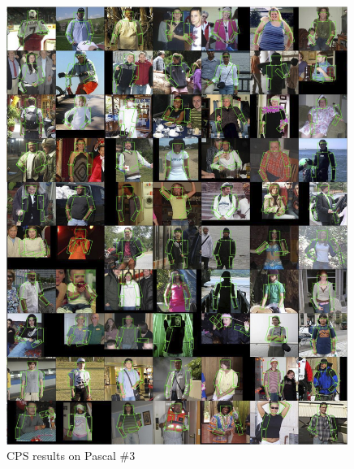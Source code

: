 \begin{figure}[tb]
\begin{center}
\includegraphics[width=0.99\textwidth]{figs/pascal-cps-3.jpg}
\caption[CPS results on Pascal \#3]{CPS results on Pascal \#3}
\label{fig:pascal-cps3}
\end{center}
\end{figure}

